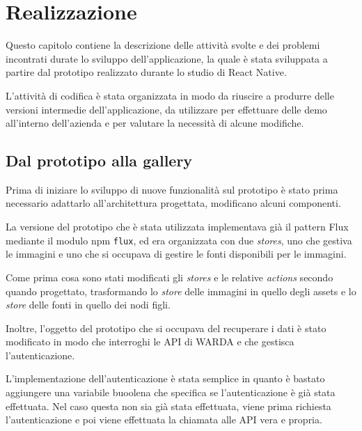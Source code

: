 
\chapter{Realizzazione}
\label{cap:realizzazione}

Questo capitolo contiene la descrizione delle attività svolte e dei problemi incontrati durate lo sviluppo dell'applicazione, la quale è stata sviluppata a partire dal prototipo realizzato durante lo studio di React Native.

L'attività di codifica è stata organizzata in modo da riuscire a produrre delle versioni intermedie dell'applicazione, da utilizzare per effettuare delle demo all'interno dell'azienda e per valutare la necessità di alcune modifiche.

\section{Dal prototipo alla gallery}

Prima di iniziare lo sviluppo di nuove funzionalità sul prototipo è stato prima necessario adattarlo all'architettura progettata, modificano alcuni componenti.

La versione del prototipo che è stata utilizzata implementava già il pattern Flux mediante il modulo npm \texttt{flux}, ed era organizzata con due \textit{stores}, uno che gestiva le immagini e uno che si occupava di gestire le fonti disponibili per le immagini.

Come prima cosa sono stati modificati gli \textit{stores} e le relative \textit{actions} secondo quando progettato, trasformando lo \textit{store} delle immagini in quello degli assets e lo \textit{store} delle fonti in quello dei nodi figli.

Inoltre, l'oggetto del prototipo che si occupava del recuperare i dati è stato modificato in modo che interroghi le API di WARDA e che gestisca l'autenticazione.

L'implementazione dell'autenticazione è stata semplice in quanto è bastato aggiungere una variabile buoolena che specifica se l'autenticazione è già stata effettuata. Nel caso questa non sia già stata effettuata, viene prima richiesta l'autenticazione e poi viene effettuata la chiamata alle API vera e propria.

